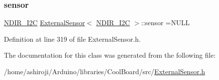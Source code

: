 \subsubsection{\texorpdfstring{sensor}{sensor}}
{\footnotesize\ttfamily \hyperlink{class_n_d_i_r___i2_c}{N\+D\+I\+R\+\_\+\+I2C} \hyperlink{class_external_sensor}{External\+Sensor}$<$ \hyperlink{class_n_d_i_r___i2_c}{N\+D\+I\+R\+\_\+\+I2C} $>$\+::sensor =N\+U\+LL\hspace{0.3cm}{\ttfamily [private]}}



Definition at line 319 of file External\+Sensor.\+h.



The documentation for this class was generated from the following file\+:\begin{DoxyCompactItemize}
\item 
/home/ashiroji/\+Arduino/libraries/\+Cool\+Board/src/\hyperlink{_external_sensor_8h}{External\+Sensor.\+h}\end{DoxyCompactItemize}
